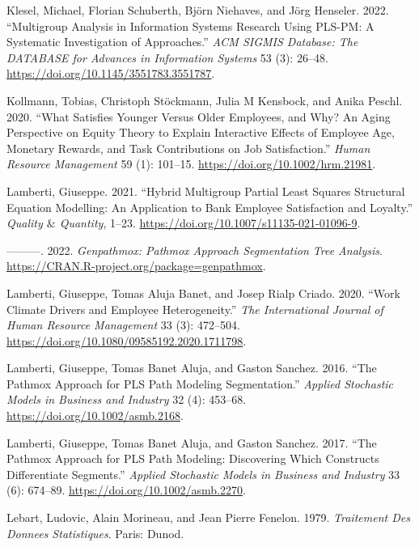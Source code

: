 \begin{CSLReferences}{1}{0}
\leavevmode{}%
Klesel, Michael, Florian Schuberth, Björn Niehaves, and Jörg Henseler. 2022. {``Multigroup Analysis in Information Systems Research Using PLS-PM: A Systematic Investigation of Approaches.''} \emph{ACM SIGMIS Database: The DATABASE for Advances in Information Systems} 53 (3): 26--48. \url{https://doi.org/10.1145/3551783.3551787}.

\leavevmode{}%
Kollmann, Tobias, Christoph Stöckmann, Julia M Kensbock, and Anika Peschl. 2020. {``What Satisfies Younger Versus Older Employees, and Why? An Aging Perspective on Equity Theory to Explain Interactive Effects of Employee Age, Monetary Rewards, and Task Contributions on Job Satisfaction.''} \emph{Human Resource Management} 59 (1): 101--15. \url{https://doi.org/10.1002/hrm.21981}.

\leavevmode{}%
Lamberti, Giuseppe. 2021. {``Hybrid Multigroup Partial Least Squares Structural Equation Modelling: An Application to Bank Employee Satisfaction and Loyalty.''} \emph{Quality \(\&\) Quantity}, 1--23. \url{https://doi.org/10.1007/s11135-021-01096-9}.

\leavevmode{}%
---------. 2022. \emph{Genpathmox: Pathmox Approach Segmentation Tree Analysis}. \url{https://CRAN.R-project.org/package=genpathmox}.

\leavevmode{}%
Lamberti, Giuseppe, Tomas Aluja Banet, and Josep Rialp Criado. 2020. {``Work Climate Drivers and Employee Heterogeneity.''} \emph{The International Journal of Human Resource Management} 33 (3): 472--504. \url{https://doi.org/10.1080/09585192.2020.1711798}.

\leavevmode{}%
Lamberti, Giuseppe, Tomas Banet Aluja, and Gaston Sanchez. 2016. {``The Pathmox Approach for PLS Path Modeling Segmentation.''} \emph{Applied Stochastic Models in Business and Industry} 32 (4): 453--68. \url{https://doi.org/10.1002/asmb.2168}.

\leavevmode{}%
Lamberti, Giuseppe, Tomas Banet Aluja, and Gaston Sanchez. 2017. {``The Pathmox Approach for PLS Path Modeling: Discovering Which Constructs Differentiate Segments.''} \emph{Applied Stochastic Models in Business and Industry} 33 (6): 674--89. \url{https://doi.org/10.1002/asmb.2270}.

\leavevmode{}%
Lebart, Ludovic, Alain Morineau, and Jean Pierre Fenelon. 1979. \emph{Traitement Des Donnees Statistiques}. Paris: Dunod.


\end{CSLReferences}
